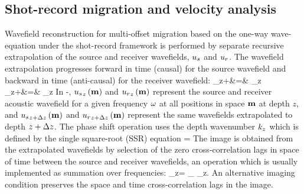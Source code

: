 \subsection{Shot-record migration and velocity analysis}

Wavefield reconstruction for multi-offset migration based on the
one-way wave-equation under the shot-record framework is performed by
separate recursive extrapolation of the source and receiver
wavefields, ${{u}_s}$ and ${{u}_r}$. The wavefield extrapolation progresses
forward in time (causal) for the source wavefield and backward in time
(anti-causal) for the receiver wavefield:
\bea \label{eqn:PHSs-SR}
\US_{z+\dz}\ofm &=& \PS{+}\US_z\ofm
\\   \label{eqn:PHSr-SR}
\UR_{z+\dz}\ofm &=& \PS{-}\UR_z\ofm
\eea
In -, ${{u}_s}_z\left ( {\bf m} \right)$ and ${{u}_r}_z\left ( {\bf m} \right)$ represent
the source and receiver acoustic wavefield for a given frequency $\omega$
at all positions in space ${\bf m}$ at depth $z$, and ${{u}_s}_{z+\Delta z}\left ( {\bf m} \right)$
and ${{u}_r}_{z+\Delta z}\left ( {\bf m} \right)$ represent the same wavefields extrapolated to
depth $z+\Delta z$. The phase shift operation uses the depth wavenumber
${k_z}$ which is defined by the single square-root (SSR) equation
\beq \label{eqn:SSR-SR}
\kz = \SSR{\ws\ofm}{\km}
\eeq
%
The image is obtained from the extrapolated wavefields by selection of
the zero cross-correlation lags in space of time between the source
and receiver wavefields, an operation which is usually implemented as
summation over frequencies:
%
\beq \label{eqn:IMC-SR}
\RR_z\ofm = \sum_\ww {} \UR_z\ofmw \;.
\eeq
An alternative imaging condition \cite[]{SavaFomel.geo.tsic} preserves
the space and time cross-correlation lags in the image.


